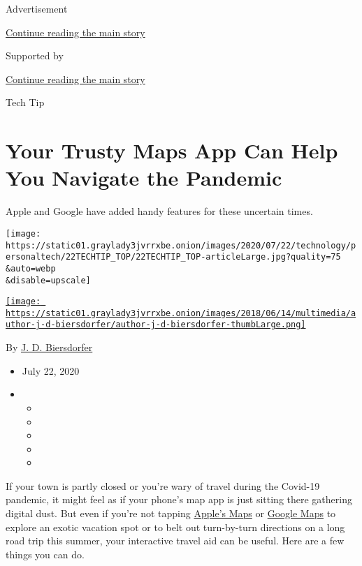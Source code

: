 Advertisement

\protect\hyperlink{after-top}{Continue reading the main story}

Supported by

\protect\hyperlink{after-sponsor}{Continue reading the main story}

Tech Tip

\hypertarget{your-trusty-maps-app-can-help-you-navigate-the-pandemic}{%
\section{Your Trusty Maps App Can Help You Navigate the
Pandemic}\label{your-trusty-maps-app-can-help-you-navigate-the-pandemic}}

Apple and Google have added handy features for these uncertain times.

\texttt{[image: https://static01.graylady3jvrrxbe.onion/images/2020/07/22/technology/personaltech/22TECHTIP\_TOP/22TECHTIP\_TOP-articleLarge.jpg?quality=75\\\&auto=webp\\\&disable=upscale]}

\href{https://www.nytimes3xbfgragh.onion/by/j-d-biersdorfer}{\texttt{[image: https://static01.graylady3jvrrxbe.onion/images/2018/06/14/multimedia/author-j-d-biersdorfer/author-j-d-biersdorfer-thumbLarge.png]}}

By \href{https://www.nytimes3xbfgragh.onion/by/j-d-biersdorfer}{J. D.
Biersdorfer}

\begin{itemize}
\item
  July 22, 2020
\item
  \begin{itemize}
  \item
  \item
  \item
  \item
  \item
  \end{itemize}
\end{itemize}

If your town is partly closed or you're wary of travel during the
Covid-19 pandemic, it might feel as if your phone's map app is just
sitting there gathering digital dust. But even if you're not tapping
\href{https://www.apple.com/ios/maps/}{Apple's Maps} or
\href{https://www.google.com/maps/about/\#!/}{Google Maps} to explore an
exotic vacation spot or to belt out turn-by-turn directions on a long
road trip this summer, your interactive travel aid can be useful. Here
are a few things you can do.

